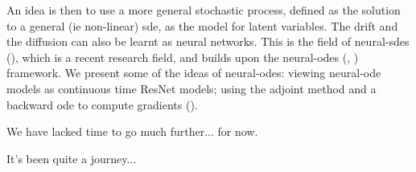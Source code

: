 An idea is then to use a more general stochastic process, defined as the solution to a general (ie non-linear) \gls{sde}, as the model for 
latent variables. The drift and the diffusion can also be learnt as neural networks. This is the field of \glspl{neural-sde} (\cite{peluchetti_infinitely_2020}), 
which is a recent research field, and builds upon the \glspl{neural-ode} (\cite{chen_neural_2019}, \cite{rubanova_latent_2019}) framework. 
We present some of the ideas of \glspl{neural-ode}: viewing \gls{neural-ode} models as continuous time ResNet models; using the adjoint method and 
a backward \gls{ode} to compute gradients (\cite{li_scalable_2020}). 

We have lacked time to go much further... for now. 

It's been quite a journey...